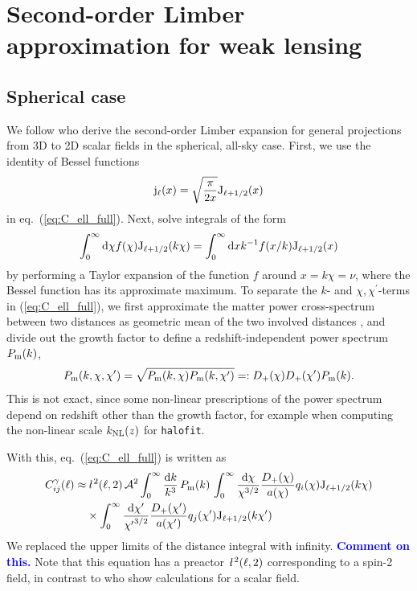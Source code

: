 \documentclass[fleqn,usenatbib]{mnras} %
\newcommand{\ellbar}{\hbox{\it \l}\,}
\newcommand{\pref}{{\cal A}}
\newcommand{\mk}[1]{{\bf\textcolor{blue}{#1}}}
\begin{document}
\section{Second-order Limber approximation for weak lensing}
\label{sec:L2}

\subsection{Spherical case}

We follow \cite{2008PhRvD..78l3506L} who derive the second-order Limber
expansion for general projections from 3D to 2D scalar fields in the spherical,
all-sky case. First, we use the identity of Bessel functions
%
\begin{equation}
  {\rm j}_\ell(x) = \sqrt{\frac{\pi}{2x}} {\rm J}_{\ell + 1/2}(x)
\end{equation}
%
in eq.~(\ref{eq:C_ell_full}). Next, \cite{2008PhRvD..78l3506L} solve
integrals of the form
%
\begin{equation}
  \int_0^\infty {\rm d} \chi f(\chi) {\rm J}_{\ell + 1/2}(k \chi)
  = \int_0^\infty {\rm d} x k^{-1} f(x/k) {\rm J}_{\ell + 1/2}(x)
  \label{eq:int_dchi}
\end{equation}
%
by performing a Taylor expansion of the function $f$ around $x = k \chi = \nu$, where
the Bessel function has its approximate maximum. To separate the $k$- and
$\chi, \chi^\prime$-terms in (\ref{eq:C_ell_full}), we first approximate the
matter power cross-spectrum between two distances as geometric mean of the two
involved distances \cite{2016arXiv161200770K}, and divide out the growth factor
to define a redshift-independent power spectrum $P_{\rm m}(k)$,
%
\begin{equation}
 P_{\rm m}(k, \chi, \chi^\prime) = \sqrt{ P_{\rm m}(k, \chi) P_{\rm m}(k, \chi^\prime) }
    =: D_+(\chi) D_+(\chi^\prime) P_{\rm m}(k).
  \label{eq:P_geom_mean}
\end{equation}
%
This is not exact, since some non-linear prescriptions of the power spectrum
depend on redshift other than the growth factor, for example when computing the
non-linear scale $k_{\rm NL}(z)$ for \texttt{halofit}.

With this, eq.~(\ref{eq:C_ell_full}) is written as
%
\begin{align}
  C^\gamma_{ij}(\ell) \approx & \, \ellbar^2(\ell, 2) \, \pref^2
                \int_0^\infty \frac{{\rm d} k}{k^3} \, P_{\rm m}(k) \,
                \int_{0}^\infty \frac{{\rm d} \chi}{\chi^{3/2}} \frac{D_+(\chi)}{a(\chi)} q_i(\chi) {\rm J}_{\ell+1/2}(k \chi)
                \nonumber \\
                 & \times
                \int_{0}^\infty \frac{{\rm d} \chi^\prime}{{\chi^\prime}^{3/2}}
                \frac{D_+(\chi^\prime)}{a(\chi^\prime)} q_j(\chi^\prime) {\rm J}_{\ell+1/2}(k \chi^\prime)
  \label{eq:C_ell_full_Pk}
\end{align}
%
We replaced the upper limits of the distance integral with infinity. \mk{Comment on this.}
Note that this equation has a preactor $\ellbar^2(\ell, 2)$ corresponding to a spin-2 field, in contrast
to \cite{2008PhRvD..78l3506L} who show calculations for a scalar field.
\end{document}
